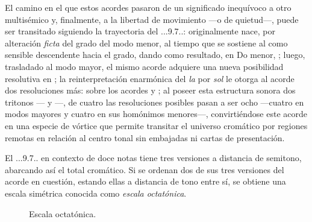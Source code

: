 \documentclass[a4paper,12pt]{article}
\begin{document}
\begin{multicols}{2}
El camino en el que estos acordes pasaron de un significado inequívoco a otro multisémico y, finalmente, a la libertad de movimiento ---o de quietud---, puede ser transitado siguiendo la trayectoria del \acorde.\Dohne..9\bemoltxt.7..: originalmente nace, por alteración \emph{ficta} del  grado del modo menor, al tiempo que se sostiene al  como sensible descendente hacia el  grado, dando como resultado, en Do menor, \hbox{;} luego, trasladado al modo mayor, el mismo acorde adquiere una nueva posibilidad resolutiva en \hbox{;} la reinterpretación enarmónica del \emph{la\bemoltxt} por \emph{sol\sostenidotxt} le otorga al acorde dos resoluciones más: sobre los acordes  y \hbox{;} al poseer esta estructura sonora dos tritonos --- y \hbox{---,} de cuatro las resoluciones posibles pasan a ser ocho ---cuatro en modos mayores y cuatro en sus homónimos menores---, convirtiéndose este acorde en una especie de vórtice que permite transitar el universo cromático por regiones remotas en relación al centro tonal sin embajadas ni cartas de presentación.

El \acorde.\Dohne..9\bemoltxt.7.. en contexto de doce notas tiene tres versiones a distancia de semitono, abarcando así el total cromático. Si se ordenan dos de sus tres versiones del acorde en cuestión, estando ellas a distancia de tono entre sí, se obtiene una escala simétrica conocida como \emph{escala octatónica}.
\end{multicols}

\begin{figure}[ht]
\centering
{}
\caption{Escala octatónica.}\label{fig:escala-octatonica}
\end{figure}
\end{document}
